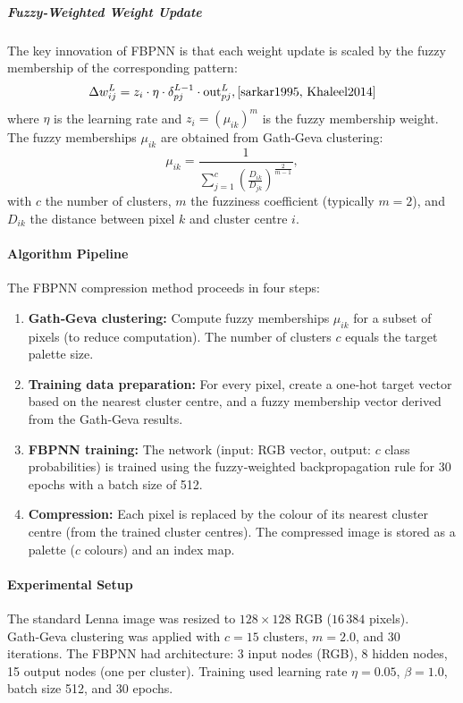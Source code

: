 \subparagraph{Fuzzy‑Weighted Weight Update}
The key innovation of FBPNN is that each weight update is scaled by the fuzzy membership of the corresponding pattern:
\[
\Delta w_{ij}^{L} = z_i \cdot \eta \cdot \delta_{pj}^{L-1} \cdot \text{out}_{pj}^{L}, \cite{sarkar1995, Khaleel2014}
\]
where $\eta$ is the learning rate and $z_i = (\mu_{ik})^{m}$ is the fuzzy membership weight. The fuzzy memberships $\mu_{ik}$ are obtained from Gath‑Geva clustering:
\[
\mu_{ik} = \frac{1}{\displaystyle\sum_{j=1}^{c} \left(\frac{D_{ik}}{D_{jk}}\right)^{\frac{2}{m-1}}},
\]
with $c$ the number of clusters, $m$ the fuzziness coefficient (typically $m=2$), and $D_{ik}$ the distance between pixel $k$ and cluster centre $i$.
\cite{hasanzadeh2005, Khaleel2014}

\paragraph{Algorithm Pipeline}
The FBPNN compression method proceeds in four steps:

\begin{enumerate}
    \item \textbf{Gath‑Geva clustering:} Compute fuzzy memberships $\mu_{ik}$ for a subset of pixels (to reduce computation). The number of clusters $c$ equals the target palette size.
    \item \textbf{Training data preparation:} For every pixel, create a one‑hot target vector based on the nearest cluster centre, and a fuzzy membership vector derived from the Gath‑Geva results.
    \item \textbf{FBPNN training:} The network (input: RGB vector, output: $c$ class probabilities) is trained using the fuzzy‑weighted backpropagation rule for 30 epochs with a batch size of 512.
    \item \textbf{Compression:} Each pixel is replaced by the colour of its nearest cluster centre (from the trained cluster centres). The compressed image is stored as a palette ($c$ colours) and an index map.
\end{enumerate}

\paragraph{Experimental Setup}
The standard Lenna image was resized to $128\times128$ RGB ($16\,384$ pixels). Gath‑Geva clustering was applied with $c = 15$ clusters, $m = 2.0$, and 30 iterations. The FBPNN had architecture: 3 input nodes (RGB), 8 hidden nodes, 15 output nodes (one per cluster). Training used learning rate $\eta = 0.05$, $\beta = 1.0$, batch size 512, and 30 epochs.

